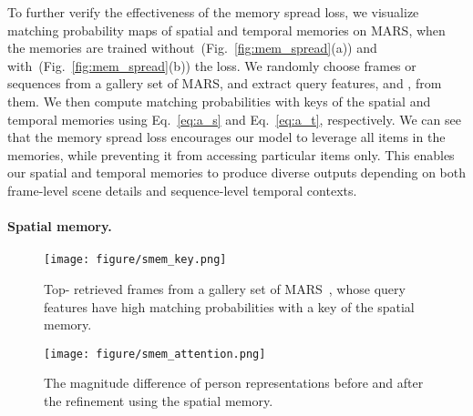 \documentclass[10pt,twocolumn,letterpaper]{article}
\begin{document}
			To further verify the effectiveness of the memory spread loss, we visualize matching probability maps of spatial and temporal memories on MARS, when the memories are trained without~(Fig.~\ref{fig:mem_spread}(a)) and with~(Fig.~\ref{fig:mem_spread}(b)) the loss. We randomly choose frames or sequences from a gallery set of MARS, and extract query features,  and , from them. We then compute matching probabilities with keys of the spatial and temporal memories using Eq.~\eqref{eq:a_s} and Eq.~\eqref{eq:a_t}, respectively. We can see that the memory spread loss encourages our model to leverage all items in the memories, while preventing it from accessing particular items only. This enables our spatial and temporal memories to produce diverse outputs depending on both frame-level scene details and sequence-level temporal contexts.
			
		\vspace{-0.5cm}
		\paragraph{Spatial memory.}
		
		
		\begin{figure}[t]
			\begin{minipage}{0.25\textwidth}
				\centering
				\texttt{[image: figure/smem\_key.png]}
				\caption{Top- retrieved frames from a gallery set of MARS~\cite{zheng2016mars}, whose query features have high matching probabilities with a key of the spatial memory.}
			  	\label{fig:smem_key}
			\end{minipage}
			\begin{minipage}{0.22\textwidth}
				\centering
				\texttt{[image: figure/smem\_attention.png]}
				\caption{The magnitude difference of person representations before and after the refinement using the spatial memory.}
			  	\label{fig:smem_attention}
			\end{minipage}\hfill
		   \vspace{-0.2cm}
		\end{figure}
\end{document}
